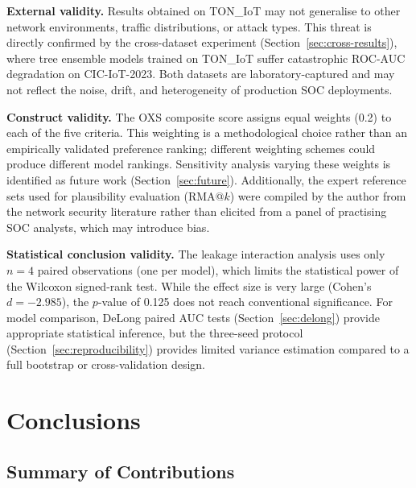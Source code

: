 \documentclass[12pt,a4paper]{report}
\begin{document}
\textbf{External validity.} Results obtained on TON\_IoT may not generalise to other network environments, traffic distributions, or attack types. This threat is directly confirmed by the cross-dataset experiment (Section~\ref{sec:cross-results}), where tree ensemble models trained on TON\_IoT suffer catastrophic ROC-AUC degradation on CIC-IoT-2023. Both datasets are laboratory-captured and may not reflect the noise, drift, and heterogeneity of production SOC deployments.

\textbf{Construct validity.} The OXS composite score assigns equal weights (0.2) to each of the five criteria. This weighting is a methodological choice rather than an empirically validated preference ranking; different weighting schemes could produce different model rankings. Sensitivity analysis varying these weights is identified as future work (Section~\ref{sec:future}). Additionally, the expert reference sets used for plausibility evaluation (RMA@$k$) were compiled by the author from the network security literature rather than elicited from a panel of practising SOC analysts, which may introduce bias.

\textbf{Statistical conclusion validity.} The leakage interaction analysis uses only $n = 4$ paired observations (one per model), which limits the statistical power of the Wilcoxon signed-rank test. While the effect size is very large (Cohen's $d = -2.985$), the $p$-value of 0.125 does not reach conventional significance. For model comparison, DeLong paired AUC tests (Section~\ref{sec:delong}) provide appropriate statistical inference, but the three-seed protocol (Section~\ref{sec:reproducibility}) provides limited variance estimation compared to a full bootstrap or cross-validation design.

\chapter{Conclusions}
\label{ch:conclusions}

\section{Summary of Contributions}
\label{sec:conclusion-contributions}
\end{document}
